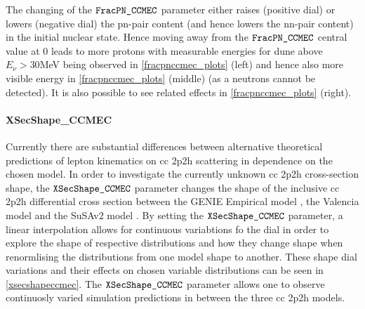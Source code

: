 The changing of the $\verb!FracPN_CCMEC!$ parameter either raises (positive dial) or lowers (negative dial) the pn-pair content (and hence lowers the nn-pair content) in the initial nuclear state. Hence moving away from the $\verb!FracPN_CCMEC!$ central value at $0$ leads to more protons with measurable energies for \acrshort{dune} above $E_\nu>30$MeV being observed in \cref{fracpnccmec_plots} (left) and hence also more visible energy in \cref{fracpnccmec_plots} (middle) (as a neutrons cannot be detected). It is also possible to see related effects in \cref{fracpnccmec_plots} (right).
\vspace{-3mm}
\paragraph{XSecShape\_CCMEC} \label{xsecshapeccmec_paragraph}
Currently there are substantial differences between alternative theoretical predictions of lepton kinematics on \acrshort{cc} \acrshort{2p2h} scattering in dependence on the chosen model. In order to investigate the currently unknown \acrshort{cc} \acrshort{2p2h} cross-section shape, the $\verb!XSecShape_CCMEC!$ parameter changes the shape of the inclusive \acrshort{cc} \acrshort{2p2h} differential cross section between the GENIE Empirical model \cite{10.1063/1.4919465}, the Valencia model \cite{PhysRevD.88.113007} and the SuSAv$2$ model \cite{Amaro_2020}. By setting the $\verb!XSecShape_CCMEC!$ parameter, a linear interpolation allows for continuous variabtions fo the dial in order to explore the shape of respective distributions and how they change shape when renormlising the distributions from one model shape to another. These shape dial variations and their effects on chosen variable distributions can be seen in \cref{xsecshapeccmec}.
The $\verb!XSecShape_CCMEC!$ parameter allows one to observe continuosly varied simulation predictions in between the three \acrshort{cc} \acrshort{2p2h} models. %
